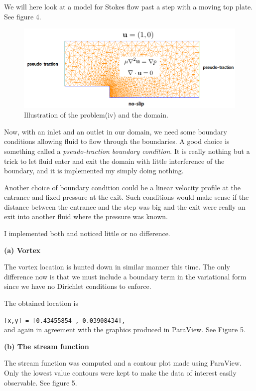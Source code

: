\documentclass[11pt,a4paper,english]{article}
\numberwithin{equation}{section}
\begin{document}
We will here look at a model for Stokes flow past a step with a moving top plate. See figure 4.

\begin{figure}[h!]
\begin{center}
  \includegraphics[scale=0.3]{stokes_step.png}
  \end{center}
  \caption{Illustration of the problem(iv) and the domain.}
\end{figure}

Now, with an inlet and an outlet in our domain, we need some boundary conditions allowing fluid to flow through the boundaries. A good choice is something called a \emph{pseudo-traction boundary condition}. It is really nothing but a trick to let fluid enter and exit the domain with little interference of the boundary, and it is implemented my simply doing nothing. 

Another choice of boundary condition could be a linear velocity profile at the entrance and fixed pressure at the exit. Such conditions would make sense if the distance between the entrance and the step was big and the exit were really an exit into another fluid where the pressure was known. 

I implemented both and noticed little or no difference. 

\textbf{(a) Vortex}

The vortex location is hunted down in similar manner this time. The only difference now is that we must include a boundary term in the variational form since we have no Dirichlet conditions to enforce.

The obtained location is 

\texttt{[x,y] =  [0.43455854 , 0.03908434],} \\

and again in agreement with the graphics produced in ParaView. See Figure 5. 


\textbf{(b) The stream function}

The stream function was computed and a contour plot made using ParaView. Only the lowest value contours were kept to make the data of interest easily observable. See figure 5. 
\end{document}
